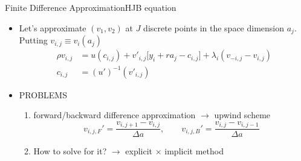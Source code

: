 \documentclass[10pt]{beamer} %
\theoremstyle{plain}
\theoremstyle{definition}
\theoremstyle{remark}
\begin{document}
\begin{frame}{Finite Difference Approximation}{HJB equation}  
\begin{itemize}
    
    \item Let's approximate $(v_1,v_2 )$ at $J$ discrete points in 
    the space dimension $ a_j$. Putting $ v_{i,j} \equiv v_i( a_j )  $
    \begin{align*}
        \rho v_{i,j} & = u( c_{i,j} ) + v'_{i,j} \Big[  y_i + ra_j - c_{i,j} \Big] + \lambda_i ( v_{-i,j} - v_{i,j} ) \\
        c_{i,j}      & = ( u' )^{-1} ( v'_{i,j} )
    \end{align*}

    \item \alert{PROBLEMS}
    \begin{enumerate}
        \item forward/backward difference approximation $ \rightarrow $ \alert{upwind scheme} \medskip
\begin{equation*}
    \label{eq:1}
    v_{i,j,F}' = \frac{ v_{i,j+1} - v_{i,j} }{ \Delta a }, \qquad v_{i,j,B}' = \frac{ v_{i,j} - v_{i,j-1} }{ \Delta a }
\end{equation*}
        \item How to solve for it? $ \rightarrow $ \alert{explicit $ \times $ implicit method}
    \end{enumerate}

\end{itemize}
\end{frame}
\end{document}
